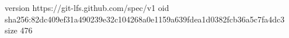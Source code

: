 version https://git-lfs.github.com/spec/v1
oid sha256:82dc409ef31a490239e32c104268a0e1159a639fdea1d0382fcb36a5c7fa4dc3
size 476
